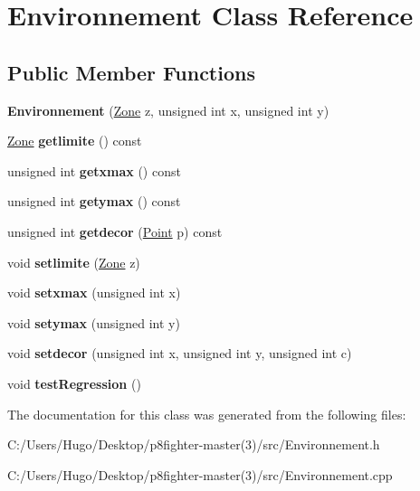 \hypertarget{class_environnement}{}\section{Environnement Class Reference}
\label{class_environnement}
\subsection*{Public Member Functions}
\begin{DoxyCompactItemize}
\item 
\mbox{\label{class_environnement_a49e0084232e33b3fd6259055af4aa295}} 
{\bfseries Environnement} (\hyperlink{class_zone}{Zone} z, unsigned int x, unsigned int y)
\item 
\mbox{\label{class_environnement_a2cc4b9cbdaf4f60897764b3a9aa44bc5}} 
\hyperlink{class_zone}{Zone} {\bfseries getlimite} () const
\item 
\mbox{\label{class_environnement_a940f826cf412300a5ab90371367f6fa8}} 
unsigned int {\bfseries getxmax} () const
\item 
\mbox{\label{class_environnement_a6ae33fe28205ceb9e8e2da8fe77ed5df}} 
unsigned int {\bfseries getymax} () const
\item 
\mbox{\label{class_environnement_aaad58924b0b23f68e92837019ce0e0fe}} 
unsigned int {\bfseries getdecor} (\hyperlink{class_point}{Point} p) const
\item 
\mbox{\label{class_environnement_a5e4c80a9fdeaa7dc4943d6e6b72336db}} 
void {\bfseries setlimite} (\hyperlink{class_zone}{Zone} z)
\item 
\mbox{\label{class_environnement_a7bfa920c1eb6a275bd22db5336f898ab}} 
void {\bfseries setxmax} (unsigned int x)
\item 
\mbox{\label{class_environnement_a2cbda216e7ab5ad9f93da7bc6bf3544c}} 
void {\bfseries setymax} (unsigned int y)
\item 
\mbox{\label{class_environnement_a184eea87f110319d2c1e80410920a2f2}} 
void {\bfseries setdecor} (unsigned int x, unsigned int y, unsigned int c)
\item 
\mbox{\label{class_environnement_aa3f8d987bb845117076b499f1e0fda6c}} 
void {\bfseries test\+Regression} ()
\end{DoxyCompactItemize}


The documentation for this class was generated from the following files\+:\begin{DoxyCompactItemize}
\item 
C\+:/\+Users/\+Hugo/\+Desktop/p8fighter-\/master(3)/src/Environnement.\+h\item 
C\+:/\+Users/\+Hugo/\+Desktop/p8fighter-\/master(3)/src/Environnement.\+cpp\end{DoxyCompactItemize}
